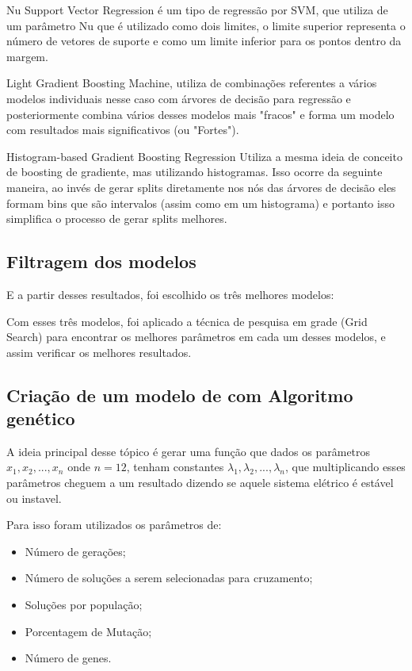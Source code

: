 \documentclass[journal]{IEEEtran}
\begin{document}
Nu Support Vector Regression é um tipo de regressão por SVM, que utiliza de um parâmetro Nu que é utilizado como dois limites, o limite superior representa o número de vetores de suporte e como um limite inferior para os pontos dentro da margem.

Light Gradient Boosting Machine, utiliza de combinações referentes a vários modelos individuais nesse caso com árvores de decisão para regressão e posteriormente combina vários desses modelos mais "fracos" e forma um modelo  com resultados mais significativos (ou "Fortes").

Histogram-based Gradient Boosting Regression Utiliza a mesma ideia de conceito de boosting de gradiente, mas utilizando histogramas.
Isso ocorre da seguinte maneira, ao invés de gerar splits diretamente nos nós das árvores de decisão eles formam bins que são intervalos (assim como em um histograma) e portanto isso simplifica o processo de gerar splits melhores.

\subsection{Filtragem dos modelos}

E a partir desses resultados, foi escolhido os três melhores modelos:



Com esses três modelos, foi aplicado a técnica de pesquisa em grade (Grid Search) para encontrar os melhores parâmetros em cada um desses modelos, e assim verificar os melhores resultados.

\subsection{Criação de um modelo de com Algoritmo genético}

A ideia principal desse tópico é gerar uma função que dados os parâmetros $x_1,x_2,...,x_n$ onde $n = 12$, tenham constantes $\lambda_1,\lambda_2,...,\lambda_n$, que multiplicando esses parâmetros cheguem a um resultado dizendo se aquele sistema elétrico é estável ou instavel.

Para isso foram utilizados os parâmetros de:
\begin{itemize}
    \item Número de gerações;
    \item Número de soluções a serem selecionadas para cruzamento;
    \item Soluções por população;
    \item Porcentagem de Mutação;
    \item Número de genes.
\end{itemize}
\end{document}
